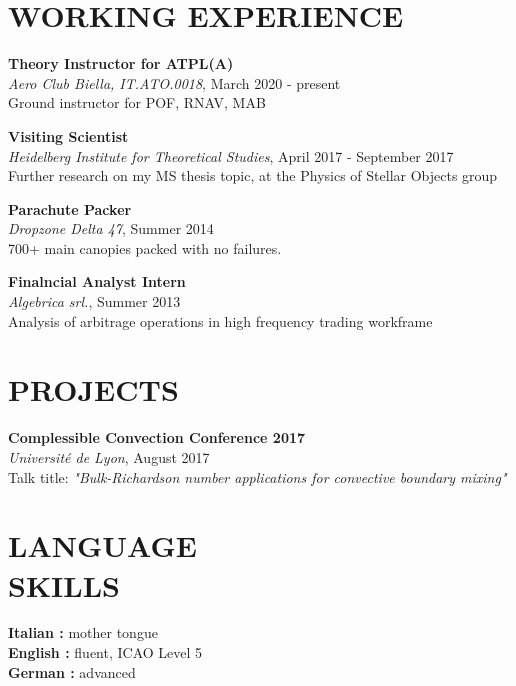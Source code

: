 \documentclass[margin]{res}
\begin{document}
\begin{resume}
\section{WORKING EXPERIENCE}

\textbf{Theory Instructor for ATPL(A)}\\
{\sl Aero Club Biella, IT.ATO.0018}, March 2020 - present\\
Ground instructor for POF, RNAV, MAB

\textbf{Visiting Scientist}\\
{\sl Heidelberg Institute for Theoretical Studies}, April 2017 - September 2017\\
Further research on my MS thesis topic, at the Physics of Stellar Objects group

\textbf{Parachute Packer}\\
{\sl Dropzone Delta 47}, Summer 2014\\
700+ main canopies packed with no failures.

\textbf{Finalncial Analyst Intern}\\
{\sl Algebrica srl.}, Summer 2013\\
Analysis of arbitrage operations in high frequency trading workframe  

\section{PROJECTS}

\textbf{Complessible Convection Conference 2017}\\
{\sl Université de Lyon}, August 2017\\
Talk title: \textit{"Bulk-Richardson number applications for convective boundary mixing"}  


\section{LANGUAGE\\SKILLS}

\textbf{Italian : } mother tongue
\\
\textbf{English : } fluent, ICAO Level 5
\\
\textbf{German : } advanced


\end{resume}
\end{document}
